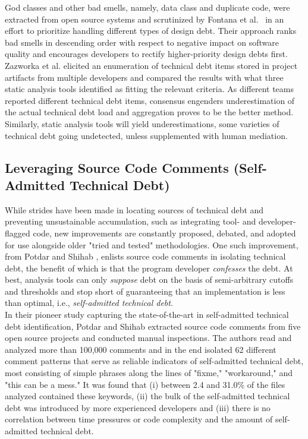 God classes and other bad smells, namely, data class and duplicate code, were extracted from open source systems and scrutinized by Fontana et al.~\cite{fontana2013code} in an effort to prioritize handling different types of design debt. Their approach ranks bad smells in descending order with respect to negative impact on software quality and encourages developers to rectify higher-priority design debts first.\\

Zazworka et al. \cite{zazworka2011investigating} elicited an enumeration of technical debt items stored in project artifacts from multiple developers and compared the results with what three static analysis tools identified as fitting the relevant criteria. As different teams reported different technical debt items, consensus engenders underestimation of the actual technical debt load and aggregation proves to be the better method. Similarly, static analysis tools  will yield underestimations, some varieties of technical debt going undetected, unless supplemented with human mediation.

\subsection{Leveraging Source Code Comments (Self-Admitted Technical Debt)}

While strides have been made in locating sources of technical debt and preventing unsustainable accumulation, such as integrating tool- and developer-flagged code, new improvements are constantly proposed, debated, and adopted for use alongside older "tried and tested" methodologies. One such improvement, from Potdar and Shihab \cite{ICSM_PotdarS14} , enlists source code comments in isolating technical debt, the benefit of which is that the program developer \emph{confesses} the debt. At best, analysis tools can only \emph{suppose} debt on the basis of semi-arbitrary cutoffs and thresholds and stop short of guaranteeing that an implementation is less than optimal, i.e., \emph{self-admitted technical debt}.\\

In their pioneer study capturing the state-of-the-art in self-admitted technical debt identification, Potdar and Shihab \cite{ICSM_PotdarS14} extracted source code comments from five open source projects and conducted manual inspections. The authors read and analyzed more than 100,000 comments and in the end isolated 62 different comment patterns that serve as reliable indicators of self-admitted technical debt, most consisting of simple phrases along the lines of "fixme," "workaround," and "this can be a mess." It was found that (i) between 2.4 and 31.0\% of the files analyzed contained these keywords, (ii) the bulk of the self-admitted technical debt was introduced by more experienced developers and (iii) there is no correlation between time pressures or code complexity and the amount of self-admitted technical debt.\\

